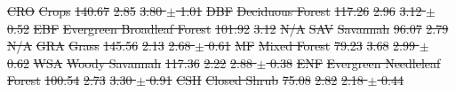 \documentclass[hess, manuscript]{copernicus}
\providecommand{\DIFdeltex}[1]{{\protect\color{red}\sout{#1}}}                      %
\providecommand{\DIFdelFL}[1]{\DIFdel{#1}} %
\providecommand{\DIFdel}[1]{\texorpdfstring{\DIFdeltex{#1}}{}} %
\begin{document}
\DIFdelFL{CRO }%
\DIFdelFL{Crops  }%
\DIFdelFL{140.67 }%
\DIFdelFL{2.85 }%
\DIFdelFL{3.80 $\pm$ 1.01 }%
\DIFdelFL{DBF }%
\DIFdelFL{Deciduous Forest  }%
\DIFdelFL{117.26 }%
\DIFdelFL{2.96 }%
\DIFdelFL{3.12 $\pm$ 0.52 }%
\DIFdelFL{EBF }%
\DIFdelFL{Evergreen Broadleaf Forest  }%
\DIFdelFL{101.92 }%
\DIFdelFL{3.12 }%
\DIFdelFL{N/A }%
\DIFdelFL{SAV }%
\DIFdelFL{Savannah  }%
\DIFdelFL{96.07 }%
\DIFdelFL{2.79 }%
\DIFdelFL{N/A }%
\DIFdelFL{GRA }%
\DIFdelFL{Grass  }%
\DIFdelFL{145.56 }%
\DIFdelFL{2.13 }%
\DIFdelFL{2.68 $\pm$ 0.61 }%
\DIFdelFL{MF }%
\DIFdelFL{Mixed Forest }%
\DIFdelFL{79.23 }%
\DIFdelFL{3.68 }%
\DIFdelFL{2.99 $\pm$ 0.62 }%
\DIFdelFL{WSA }%
\DIFdelFL{Woody Savannah  }%
\DIFdelFL{117.36 }%
\DIFdelFL{2.22 }%
\DIFdelFL{2.88 $\pm$ 0.38 }%
\DIFdelFL{ENF }%
\DIFdelFL{Evergreen Needleleaf Forest  }%
\DIFdelFL{100.54 }%
\DIFdelFL{2.73 }%
\DIFdelFL{3.30 $\pm$ 0.91 }%
\DIFdelFL{CSH }%
\DIFdelFL{Closed Shrub  }%
\DIFdelFL{75.08 }%
\DIFdelFL{2.82 }%
\DIFdelFL{2.18 $\pm$ 0.44 }%

\end{document}
